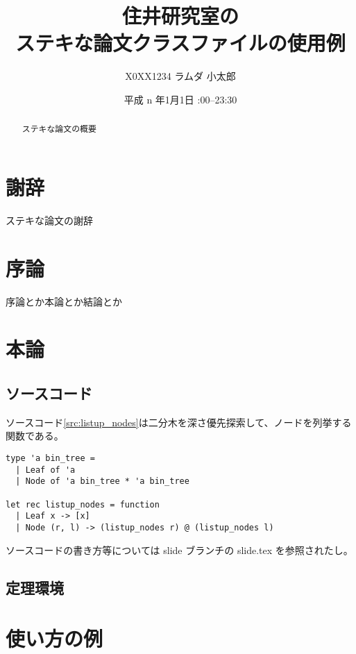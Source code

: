 \documentclass[sharedthmnum]{sumiilab-paper}
\title{住井研究室の\\ステキな論文クラスファイルの使用例}
\author{X0XX1234 ラムダ 小太郎}
\institute{東北大学 工学部\\情報知能システム総合学科}%
\date{平成 n 年1月1日 \quad 23:00--23:30}
\begin{document}
\maketitle

\begin{abstract}
ステキな論文の概要
\end{abstract}

\chapter*{謝辞}

ステキな論文の謝辞

\tableofcontents


\chapter{序論}

序論とか本論とか結論とか \cite{Pierce:TypeSystems}

\chapter{本論}

\section{ソースコード}

ソースコード\ref{src:listup_nodes}は二分木を深さ優先探索して、ノードを列挙する関数である。
\begin{lstlisting}[caption=二分木のノードのリストアップ,label=src:listup_nodes]
type 'a bin_tree =
  | Leaf of 'a
  | Node of 'a bin_tree * 'a bin_tree

let rec listup_nodes = function
  | Leaf x -> [x]
  | Node (r, l) -> (listup_nodes r) @ (listup_nodes l)
\end{lstlisting}
ソースコードの書き方等については slide ブランチの slide.tex を参照されたし。

\section{定理環境}

\chapter{使い方の例}
\end{document}
